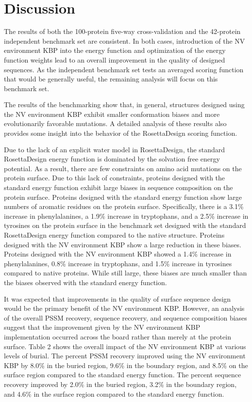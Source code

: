 \section{Discussion}

The results of both the 100-protein five-way cross-validation and the 42-protein independent benchmark set are consistent.
In both cases, introduction of the NV environment KBP into the energy function and optimization of the energy function weights lead to an overall improvement in the quality of designed sequences.
As the independent benchmark set tests an averaged scoring function that would be generally useful, the remaining analysis will focus on this benchmark set. 

The results of the benchmarking show that, in general, structures designed using the NV environment KBP exhibit smaller conformation biases and more evolutionarily favorable mutations.
A detailed analysis of these results also provides some insight into the behavior of the RosettaDesign scoring function.

Due to the lack of an explicit water model in RosettaDesign, the standard RosettaDesign energy function is dominated by the solvation free energy potential.
As a result, there are few constraints on amino acid mutations on the protein surface.
Due to this lack of constraints, proteins designed with the standard energy function exhibit large biases in sequence composition on the protein surface.
Proteins designed with the standard energy function show large numbers of aromatic residues on the protein surface.
Specifically, there is a 3.1\% increase in phenylalanines, a 1.9\% increase in tryptophans, and a 2.5\% increase in tyrosines on the protein surface in the benchmark set designed with the standard RosettaDesign energy function compared to the native structure.
Proteins designed with the NV environment KBP show a large reduction in these biases.
Proteins designed with the NV environment KBP showed a 1.4\% increase in phenylalanines, 0.8\% increase in tryptophans, and 1.5\% increase in tyrosines compared to native proteins.
While still large, these biases are much smaller than the biases observed with the standard energy function. 

It was expected that improvements in the quality of surface sequence design would be the primary benefit of the NV environment KBP.
However, an analysis of the overall PSSM recovery, sequence recovery, and sequence composition biases suggest that the improvement given by the NV environment KBP implementation occurred across the board rather than merely at the protein surface.
Table 2 shows the overall impact of the NV environment KBP at various levels of burial.
The percent PSSM recovery improved using the NV environment KBP by 8.0\% in the buried region, 9.6\% in the boundary region, and 8.5\% on the surface region compared to the standard energy function.
The percent sequence recovery improved by 2.0\% in the buried region, 3.2\% in the boundary region, and 4.6\% in the surface region compared to the standard energy function.
 
